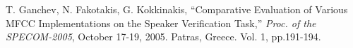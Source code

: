 \documentclass[twocolumn]{cinc}
\begin{document}






\begin{thebibliography}{99}{ %
 
  T. Ganchev, N. Fakotakis, G. Kokkinakis, ``Comparative Evaluation of Various MFCC Implementations on the Speaker Verification Task,'' 
 \emph{Proc. of the SPECOM-2005}, October 17-19, 2005. Patras, Greece. Vol. 1, pp.191-194.
 

      
}\end{thebibliography}


\end{document}
